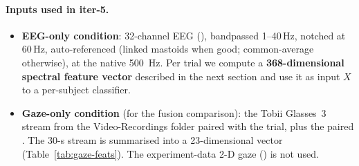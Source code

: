 \paragraph{Inputs used in iter-5.}
\begin{itemize}
  \item \textbf{EEG-only condition}: 32-channel EEG
        (), bandpassed 1--40\,Hz,
        notched at 60\,Hz, auto-referenced (linked mastoids when good;
        common-average otherwise), at the native \SI{500}{\Hz}. Per trial
        we compute a \textbf{368-dimensional spectral feature vector}
        described in the next section and use it as input $X$ to a
        per-subject classifier.
  \item \textbf{Gaze-only condition} (for the fusion comparison): the
        Tobii Glasses~3  stream from the Video-Recordings
        folder paired with the trial, plus the paired .
        The 30-s stream is summarised into a 23-dimensional vector
        (Table~\ref{tab:gaze-feats}). The experiment-data 2-D gaze
        () is not used.
\end{itemize}

